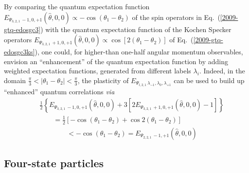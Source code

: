 \documentclass[pra,amsfonts,showpacs,showkeys,preprint]{revtex4}
\begin{document}
By comparing the quantum expectation function
$E_{{ \Psi_{3,2,1}}\,-1, 0, +1 } ({\hat \theta},0,0 )\propto - \cos (\theta_1 - \theta_2)$
of the spin operators in Eq.~(\ref{2009-gtq-edosgc3})
with the quantum expectation function  of the Kochen Specker operators
$E_{{ \Psi_{3,2,1}}\,+1, 0, +1 } ({\hat \theta},0,0 ) \propto
\cos \left[2 ( \theta_1 - \theta_2 )\right]$
of Eq.~(\ref{2009-gtq-edosgc3ks}),
one could, for higher-than one-half angular momentum observables, envision an ``enhancement'' of the quantum expectation function
by adding weighted expectation functions, generated from different labels $\lambda_i$.
Indeed, in the domain $\frac{\pi }{3}< | \theta_1 -\theta_2 | < \frac{\pi }{3}$,
the plasticity of
$E_{{ \Psi_{l,2,1}}\,\lambda_{-1},  \lambda_{0} , \lambda_{+1} }$
can be used to build up ``enhanced'' quantum correlations {\it via}
\begin{equation}
\begin{array}{rcl}
&&\frac{1}{2}\left\{
E_{{ \Psi_{3,2,1}}\,-1, 0, +1 } ({\hat \theta},0,0 )
+
3\left[2 E_{{ \Psi_{3,2,1}}\,+1, 0, +1 } ({\hat \theta},0,0 ) -1\right]\right\}
\\
&&\qquad =  \frac{1}{2}\left[-\cos (\theta_1 -\theta_2 ) + \cos 2 (\theta_1 -\theta_2 )
\right]
\\
&& \qquad \qquad
< -\cos (\theta_1 -\theta_2 ) =  E_{{ \Psi_{2,2,1}}\,-1, +1 } ({\hat \theta},0,0 )
\end{array}
\label{2009-gtq-eqcs3}
\end{equation}






\subsection{Four-state particles}
\end{document}
